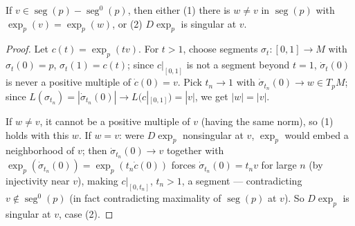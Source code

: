 \begin{lemma}
  \label{lem:pet-ch5-cut-locus-characterization}
  If $v\in\operatorname{seg}(p)-\operatorname{seg}^0(p)$, then either (1) there is
  $w\ne v$ in $\operatorname{seg}(p)$ with $\exp_p(v)=\exp_p(w)$, or (2) $D\exp_p$
  is singular at $v$.
\end{lemma}
\begin{proof}
  Let $c(t)=\exp_p(tv)$. For $t>1$, choose segments $\sigma_t:[0,1]\to M$ with
  $\sigma_t(0)=p$, $\sigma_t(1)=c(t)$; since $c|_{[0,1]}$ is not a segment beyond
  $t=1$, $\dot\sigma_t(0)$ is never a positive multiple of $\dot c(0)=v$. Pick
  $t_n\to1$ with $\dot\sigma_{t_n}(0)\to w\in T_pM$; since
  $L(\sigma_{t_n})=|\dot\sigma_{t_n}(0)|\to L(c|_{[0,1]})=|v|$, we get $|w|=|v|$.

  If $w\ne v$, it cannot be a positive multiple of $v$ (having the same norm), so
  (1) holds with this $w$. If $w=v$: were $D\exp_p$ nonsingular at $v$, $\exp_p$
  would embed a neighborhood of $v$; then $\dot\sigma_{t_n}(0)\to v$ together with
  $\exp_p(\dot\sigma_{t_n}(0))=\exp_p(t_n\dot c(0))$ forces
  $\dot\sigma_{t_n}(0)=t_n v$ for large $n$ (by injectivity near $v$), making
  $c|_{[0,t_n]}$, $t_n>1$, a segment — contradicting $v\notin\operatorname{seg}^0(p)$
  (in fact contradicting maximality of $\operatorname{seg}(p)$ at $v$). So
  $D\exp_p$ is singular at $v$, case (2).
\end{proof}

